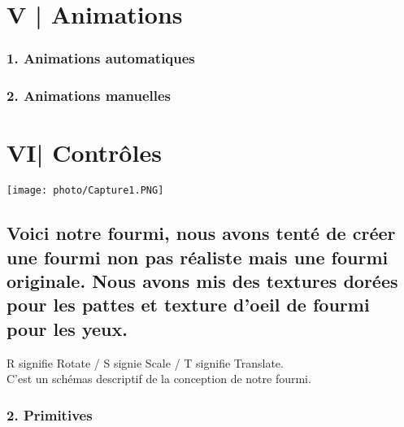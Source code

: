 \documentclass[11pt]{article}
\begin{document}
    \chapter{\Large {V | Animations}}
     \begin{center}
        \subsection*{1. Animations automatiques}
        \subsection*{2. Animations manuelles}
    \end{center}
    
    \chapter{\Large {VI| Contrôles}}
    
    
    
    
    
    
\newpage
\fancyhf{}

\begin{center}
\texttt{[image: photo/Capture1.PNG]} 
\end{center}

\section*{Voici notre fourmi, nous avons tenté de créer une fourmi non pas réaliste mais une fourmi originale. Nous avons mis des textures dorées pour les pattes et texture d'oeil de fourmi pour les yeux. }









\newpage
\fancyhf{}

\begin{center}

\end{center}

R signifie Rotate / S signie Scale / T signifie Translate. \\
C'est un schémas descriptif de la conception de notre fourmi.

\subsection*{2. Primitives}
\end{document}
